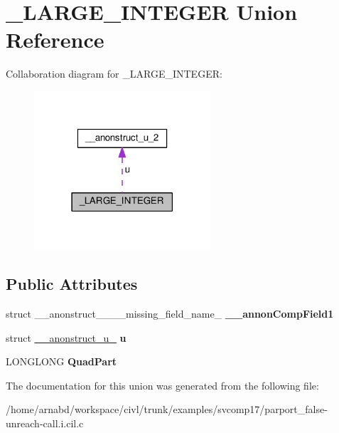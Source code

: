 \hypertarget{union__LARGE__INTEGER}{}\section{\+\_\+\+L\+A\+R\+G\+E\+\_\+\+I\+N\+T\+E\+G\+E\+R Union Reference}
\label{union__LARGE__INTEGER}


Collaboration diagram for \+\_\+\+L\+A\+R\+G\+E\+\_\+\+I\+N\+T\+E\+G\+E\+R\+:
\nopagebreak
\begin{figure}[H]
\begin{center}
\leavevmode
\includegraphics[width=186pt]{union__LARGE__INTEGER__coll__graph}
\end{center}
\end{figure}
\subsection*{Public Attributes}
\begin{DoxyCompactItemize}
\item 
\hypertarget{union__LARGE__INTEGER_a2476c7eec28e2fef55765988c5c48cab}{}struct \+\_\+\+\_\+anonstruct\+\_\+\+\_\+\+\_\+\+\_\+missing\+\_\+field\+\_\+name\+\_ {\bfseries \+\_\+\+\_\+annon\+Comp\+Field1}\label{union__LARGE__INTEGER_a2476c7eec28e2fef55765988c5c48cab}

\item 
\hypertarget{union__LARGE__INTEGER_abdc924c042a51e01a12ecb132b631911}{}struct \hyperlink{struct____anonstruct__u__2}{\+\_\+\+\_\+anonstruct\+\_\+u\+\_} {\bfseries u}\label{union__LARGE__INTEGER_abdc924c042a51e01a12ecb132b631911}

\item 
\hypertarget{union__LARGE__INTEGER_a34beb9c05c3a2982d57fc450cc934ae3}{}L\+O\+N\+G\+L\+O\+N\+G {\bfseries Quad\+Part}\label{union__LARGE__INTEGER_a34beb9c05c3a2982d57fc450cc934ae3}

\end{DoxyCompactItemize}


The documentation for this union was generated from the following file\+:\begin{DoxyCompactItemize}
\item 
/home/arnabd/workspace/civl/trunk/examples/svcomp17/parport\+\_\+false-\/unreach-\/call.\+i.\+cil.\+c\end{DoxyCompactItemize}
